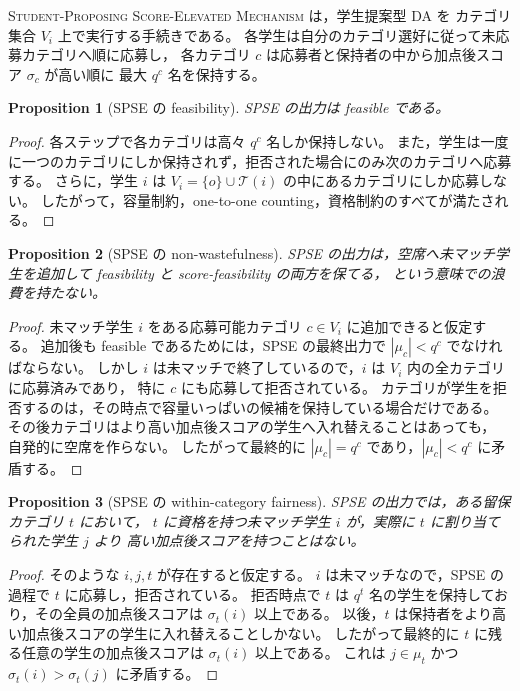 \documentclass[
  12pt,
  a4paper,
  oneside,
  onecolumn,
  titlepage,
  final
]{jsarticle}
\newtheorem{proposition}{Proposition}
\newcommand{\1}{\mathbf{1}}
\begin{document}
\textsc{Student-Proposing Score-Elevated Mechanism} は，学生提案型 DA を
カテゴリ集合 $V_i$ 上で実行する手続きである。
各学生は自分のカテゴリ選好に従って未応募カテゴリへ順に応募し，
各カテゴリ $c$ は応募者と保持者の中から加点後スコア $\sigma_c$ が高い順に
最大 $q^c$ 名を保持する。

\begin{proposition}[SPSE の feasibility]
SPSE の出力は feasible である。
\end{proposition}

\begin{proof}
各ステップで各カテゴリは高々 $q^c$ 名しか保持しない。
また，学生は一度に一つのカテゴリにしか保持されず，拒否された場合にのみ次のカテゴリへ応募する。
さらに，学生 $i$ は $V_i=\{o\}\cup\mathcal T(i)$ の中にあるカテゴリにしか応募しない。
したがって，容量制約，one-to-one counting，資格制約のすべてが満たされる。
\end{proof}

\begin{proposition}[SPSE の non-wastefulness]
SPSE の出力は，空席へ未マッチ学生を追加して feasibility と score-feasibility の両方を保てる，
という意味での浪費を持たない。
\end{proposition}

\begin{proof}
未マッチ学生 $i$ をある応募可能カテゴリ $c\in V_i$ に追加できると仮定する。
追加後も feasible であるためには，SPSE の最終出力で $|\mu_c|<q^c$ でなければならない。
しかし $i$ は未マッチで終了しているので，$i$ は $V_i$ 内の全カテゴリに応募済みであり，
特に $c$ にも応募して拒否されている。
カテゴリが学生を拒否するのは，その時点で容量いっぱいの候補を保持している場合だけである。
その後カテゴリはより高い加点後スコアの学生へ入れ替えることはあっても，
自発的に空席を作らない。
したがって最終的に $|\mu_c|=q^c$ であり，$|\mu_c|<q^c$ に矛盾する。
\end{proof}

\begin{proposition}[SPSE の within-category fairness]
SPSE の出力では，ある留保カテゴリ $t$ において，
$t$ に資格を持つ未マッチ学生 $i$ が，実際に $t$ に割り当てられた学生 $j$ より
高い加点後スコアを持つことはない。
\end{proposition}

\begin{proof}
そのような $i,j,t$ が存在すると仮定する。
$i$ は未マッチなので，SPSE の過程で $t$ に応募し，拒否されている。
拒否時点で $t$ は $q^t$ 名の学生を保持しており，その全員の加点後スコアは
$\sigma_t(i)$ 以上である。
以後，$t$ は保持者をより高い加点後スコアの学生に入れ替えることしかない。
したがって最終的に $t$ に残る任意の学生の加点後スコアは $\sigma_t(i)$ 以上である。
これは $j\in\mu_t$ かつ $\sigma_t(i)>\sigma_t(j)$ に矛盾する。
\end{proof}
\end{document}
